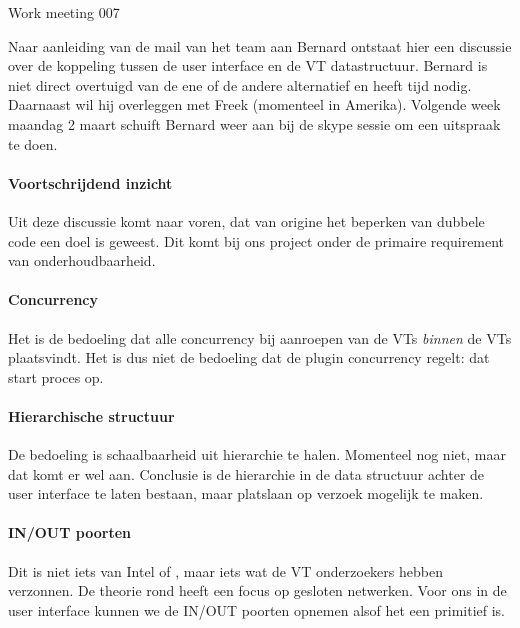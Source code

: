 \documentclass[a4paper,final]{article}
\begin{document}
\begin{Minutes}{Work meeting 007}
\subtitle{Einde iteratie 3, demo Bernard}

\maketitle%



Naar aanleiding van de mail van het team aan Bernard ontstaat hier
een discussie over de koppeling tussen de user interface en
de VT datastructuur. Bernard is niet direct overtuigd van de 
ene of de andere alternatief en heeft tijd nodig. Daarnaast
wil hij overleggen met Freek (momenteel in Amerika).
Volgende week maandag 2 maart schuift Bernard weer aan bij de skype sessie
om een uitspraak te doen.

\paragraph{Voortschrijdend inzicht} Uit deze discussie komt naar voren,
dat van origine het beperken van dubbele code een doel is 
geweest. Dit komt bij ons project onder de primaire requirement
van onderhoudbaarheid.

\paragraph{Concurrency} Het is de bedoeling dat alle concurrency bij
aanroepen van de VTs \textit{binnen} de VTs plaatsvindt. Het is dus niet
de bedoeling dat de plugin concurrency regelt: dat start \een proces op.


\paragraph{Hierarchische structuur} De bedoeling is schaalbaarheid
uit hierarchie te halen. Momenteel nog niet, maar dat komt er wel aan.
Conclusie is de hierarchie in de data structuur achter de user interface
te laten bestaan, maar platslaan op verzoek mogelijk te maken.

\paragraph{IN/OUT poorten} Dit is niet iets van Intel of \xmas, maar iets
wat de VT onderzoekers hebben verzonnen. De theorie rond \xmas heeft een focus
op gesloten netwerken. Voor ons in de user interface kunnen we de \textsc{IN/OUT}
poorten opnemen alsof het een primitief is.


\end{Minutes}
\end{document}
